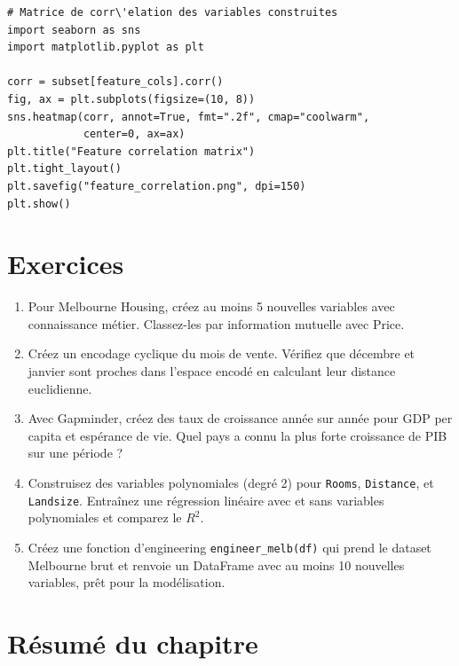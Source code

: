 \begin{verbatim}
# Matrice de corr\'elation des variables construites
import seaborn as sns
import matplotlib.pyplot as plt

corr = subset[feature_cols].corr()
fig, ax = plt.subplots(figsize=(10, 8))
sns.heatmap(corr, annot=True, fmt=".2f", cmap="coolwarm",
            center=0, ax=ax)
plt.title("Feature correlation matrix")
plt.tight_layout()
plt.savefig("feature_correlation.png", dpi=150)
plt.show()
\end{verbatim}

\section{Exercices}

\begin{exercise}
\begin{enumerate}
  \item Pour Melbourne Housing, cr\'eez au moins 5 nouvelles variables avec connaissance m\'etier. Classez-les par information mutuelle avec Price.
  \item Cr\'eez un encodage cyclique du mois de vente. V\'erifiez que d\'ecembre et janvier sont proches dans l'espace encod\'e en calculant leur distance euclidienne.
  \item Avec Gapminder, cr\'eez des taux de croissance ann\'ee sur ann\'ee pour GDP per capita et esp\'erance de vie. Quel pays a connu la plus forte croissance de PIB sur une p\'eriode ?
  \item Construisez des variables polynomiales (degr\'e 2) pour \texttt{Rooms}, \texttt{Distance}, et \texttt{Landsize}. Entra\^inez une r\'egression lin\'eaire avec et sans variables polynomiales et comparez le $R^2$.
  \item Cr\'eez une fonction d'engineering \texttt{engineer\_melb(df)} qui prend le dataset Melbourne brut et renvoie un DataFrame avec au moins 10 nouvelles variables, pr\^et pour la mod\'elisation.
\end{enumerate}
\end{exercise}

\section{R\'esum\'e du chapitre}


